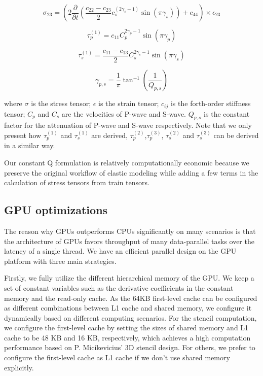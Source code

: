\documentclass{paris17}
\begin{document}
\begin{equation}
  \sigma_{23} = \left ( 2\frac{\partial}{\partial t} \left( \frac{c_{22}-c_{23}}{2}c_s^{(2\gamma_s-1)}\sin(\pi\gamma_s) \right) + c_{44} \right )\times \epsilon_{23}
\end{equation}

\begin{equation}
  \tau_p^{(1)} = c_{11}C_p^{2\gamma_p - 1}\sin(\pi \gamma_p)
\end{equation}

\begin{equation}
  \tau_s^{(1)} = \frac{c_{11} - c_{13}}{2}C_s^{2\gamma_s - 1}\sin(\pi \gamma_s)
\end{equation}

\begin{equation}
  \gamma_{p,s}=\frac{1}{\pi}\tan^{-1}(\frac{1}{Q_{p,s}})
\end{equation}

where $\sigma$ is the stress tensor; $\epsilon$ is the strain tensor; $c_{ij}$ is the forth-order stiffness tensor; $C_p$ and $C_s$ are the velocities of P-wave and S-wave. $Q_{p,s}$ is the constant factor for the attenuation of P-wave and S-wave respectively. Note that we only present how $\tau_p^{(1)}$ and $\tau_s^{(1)}$ are derived, $\tau_p^{(2)}$,$\tau_p^{(3)}$, $\tau_s^{(2)}$ and $\tau_s^{(3)}$ can be derived in a similar way.

Our constant Q formulation is relatively computationally economic because we preserve the original workflow of elastic modeling while adding a few terms in the calculation of stress tensors from train tensors.

\subsection{GPU optimizations}

The reason why GPUs outperforms CPUs significantly on many scenarios is that the architecture of GPUs favors throughput of many data-parallel tasks over the latency of a single thread. We have an efficient parallel design on the GPU platform with three main strategies.

Firstly, we fully utilize the different hierarchical memory of the GPU. We keep a set of constant variables such as the derivative coefficients in the constant memory and the read-only cache. As the 64KB first-level cache can be configured as different combinations between L1 cache and shared memory, we configure it dynamically based on different computing scenarios. For the stencil computation, we configure the first-level cache by setting the sizes of shared memory and L1 cache to be 48 KB and 16 KB, respectively, which achieves a high computation performance based on P. Micikevicius’ 3D stencil design. For others, we prefer to configure the first-level cache as L1 cache if we don't use shared memory explicitly.
\end{document}
